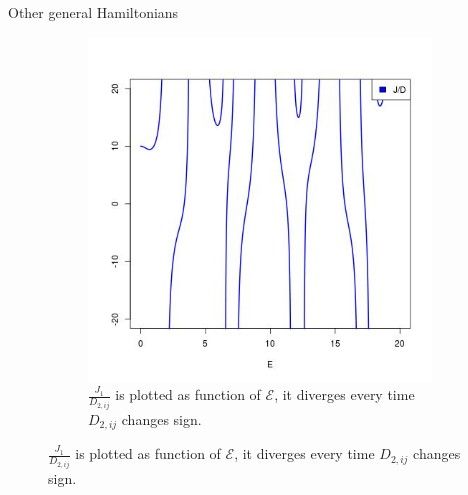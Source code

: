 \begin{section}{Other general Hamiltonians}
\begin{figure}
\begin{subfigure}{.5\textwidth}
  \includegraphics[width=1\linewidth]{Chapters/ratio.jpg}
  \caption{$\frac{J_{1}}{D_{2,ij}}$ is plotted as function of $\mathcal{E}$, it diverges every time $D_{2,ij}$ changes sign.}
  \label{Fig1:ratio}
\end{subfigure}
\label{Fig1}
\end{figure}

\end{section}


